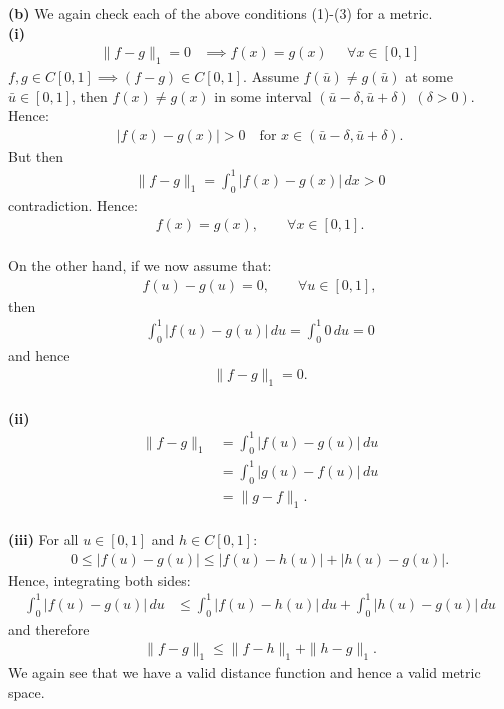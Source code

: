 \documentclass[12pt]{article}
\begin{document}
\newpage
\noindent
\textbf{(b)} We again check each of the above conditions (1)-(3) for a metric.\\
\textbf{(i)}
\begin{align*}
\|f-g\|_1 = 0
&\implies f(x) = g(x) \;\;\;\;\; \forall x \in [0, 1]
\end{align*}
$f,g\in C[0,1] \implies (f-g) \in C[0,1]$. Assume $f(\bar{u}) \neq g(\bar{u})$ at some $\bar{u}\in[0,1]$, then $f(x) \ne g(x)$ 
in some interval $(\bar{u}-\delta,\bar{u}+\delta)$ $(\delta>0)$.
\\
Hence:
\begin{align*}
|f(x)-g(x)|>0 \quad \text{for } x\in(\bar{u}-\delta,\bar{u}+\delta).
\end{align*}
But then
\begin{align*}
\|f-g\|_1 = \int_0^1 |f(x)-g(x)|\,dx>0
\end{align*}
contradiction.  Hence:
\begin{align*}
f(x)=g(x), \qquad \forall x\in[0,1].
\end{align*}
\\
On the other hand, if we now assume that:
\begin{align*}
f(u)-g(u)=0, \qquad \forall u\in[0,1],
\end{align*}
then
\begin{align*}
\int_0^1 |f(u)-g(u)|\,du
=\int_0^1 0\,du
=0
\end{align*}
and hence
\begin{align*}
\|f-g\|_1=0.
\end{align*}
\\
\textbf{(ii)}
\begin{align*}
\|f-g\|_1
&=\int_0^1 |f(u)-g(u)|\,du \\
&=\int_0^1 |g(u)-f(u)|\,du \\
&=\|g-f\|_1.
\end{align*}
\\
\textbf{(iii)} For all $u\in[0,1]$ and $h \in C[0,1]$:
\begin{align*}
0 \le |f(u)-g(u)|
\leq |f(u)-h(u)|+|h(u)-g(u)|.
\end{align*}
Hence, integrating both sides:
\begin{align*}
\int_0^1 |f(u)-g(u)|\,du
&\leq \int_0^1 |f(u)-h(u)|\,du
+\int_0^1 |h(u)-g(u)|\,du
\end{align*}
and therefore
\begin{align*}
\|f-g\|_1
\leq \|f-h\|_1+\|h-g\|_1.
\end{align*}
We again see that we have a valid distance function and hence a valid metric space.
\end{document}

